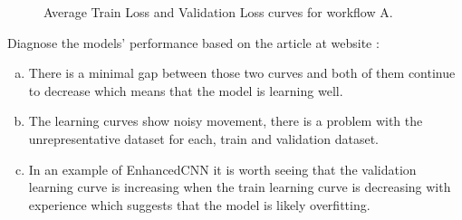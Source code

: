 \documentclass[runningheads]{llncs}
\begin{document}
\begin{figure}[H]
\centering
{}
\quad
{}
\quad
{}
\label{AvgPlotA}
\caption{Average Train Loss and Validation Loss curves for workflow A.}
\end{figure}

Diagnose the models' performance based on the article at website \cite{LearningCurves}:
\begin{enumerate}[(a)]
\item There is a minimal gap between those two curves and both of them continue to decrease which means that the model is learning well.
\item The learning curves show noisy movement, there is a problem with the unrepresentative dataset for each, train and validation dataset.
\item In an example of EnhancedCNN it is worth seeing that the validation learning curve is increasing when the train learning curve is decreasing with experience which suggests that the model is likely overfitting.
\end{enumerate}
\end{document}

